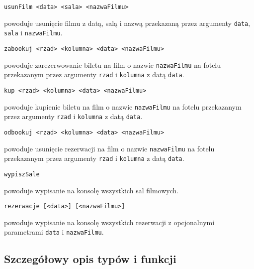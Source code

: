 \documentclass[12pt,a4paper,oneside]{article}
\begin{document}
\begin{Verbatim}[fontsize=\small]
usunFilm <data> <sala> <nazwaFilmu>                  
\end{Verbatim}
powoduje usunięcie filmu z datą, salą i nazwą przekazaną przez argumenty \texttt{data}, \texttt{sala} i \texttt{nazwaFilmu}. \newline

\begin{Verbatim}[fontsize=\small]
zabookuj <rzad> <kolumna> <data> <nazwaFilmu>         
\end{Verbatim}
powoduje zarezerwowanie biletu na film o nazwie \texttt{nazwaFilmu} na fotelu przekazanym przez argumenty \texttt{rzad} i \texttt{kolumna} z datą \texttt{data}. \newline

\begin{Verbatim}[fontsize=\small]
kup <rzad> <kolumna> <data> <nazwaFilmu>              
\end{Verbatim}
powoduje kupienie biletu na film o nazwie \texttt{nazwaFilmu} na fotelu przekazanym przez argumenty \texttt{rzad} i \texttt{kolumna} z datą \texttt{data}. \newline

\begin{Verbatim}[fontsize=\small]
odbookuj <rzad> <kolumna> <data> <nazwaFilmu>         
\end{Verbatim}
powoduje usunięcie rezerwacji na film o nazwie \texttt{nazwaFilmu} na fotelu przekazanym przez argumenty \texttt{rzad} i \texttt{kolumna} z datą \texttt{data}. \newline

\begin{Verbatim}[fontsize=\small]
wypiszSale                                                 
\end{Verbatim}
powoduje wypisanie na konsolę wszystkich sal filmowych. \newline

\begin{Verbatim}[fontsize=\small]
rezerwacje [<data>] [<nazwaFilmu>]                                                            
\end{Verbatim}
powoduje wypisanie na konsolę wszystkich rezerwacji z opcjonalnymi parametrami \texttt{data} i \texttt{nazwaFilmu}.


\subsection{Szczegółowy opis typów i funkcji}
\end{document}
